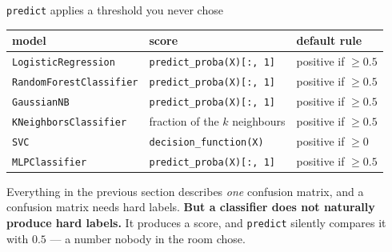 \documentclass[aspectratio=169]{beamer}
\begin{document}
\begin{frame}[shrink=7]{\texttt{predict} applies a threshold you never chose}
  \begin{center}\small
  \begin{tabular}{@{}lll@{}}
    \toprule
    model & score & default rule\\
    \midrule
    \texttt{LogisticRegression}     & \texttt{predict\_proba(X)[:, 1]} &
      positive if $\ge 0.5$\\
    \texttt{RandomForestClassifier} & \texttt{predict\_proba(X)[:, 1]} &
      positive if $\ge 0.5$\\
    \texttt{GaussianNB}             & \texttt{predict\_proba(X)[:, 1]} &
      positive if $\ge 0.5$\\
    \texttt{KNeighborsClassifier}   & fraction of the $k$ neighbours &
      positive if $\ge 0.5$\\
    \texttt{SVC}                    & \texttt{decision\_function(X)} &
      positive if $\ge 0$\\
    \texttt{MLPClassifier}          & \texttt{predict\_proba(X)[:, 1]} &
      positive if $\ge 0.5$\\
    \bottomrule
  \end{tabular}
  \end{center}
  \vspace{0.2em}
  \begin{alertblock}{}
    \centering\small
    Everything in the previous section describes \emph{one} confusion matrix,
    and a confusion matrix needs hard labels. \textbf{But a classifier does
    not naturally produce hard labels.} It produces a score, and
    \texttt{predict} silently compares it with $0.5$ --- a number nobody in
    the room chose.
  \end{alertblock}
\end{frame}
\end{document}
